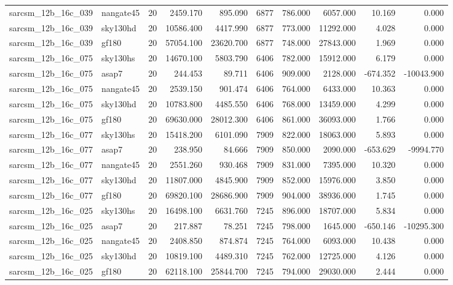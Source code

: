 \begin{tabular}{llrrrrrrrr}
sarcsm\_12b\_16c\_039 & nangate45 & 20 & 2459.170 & 895.090 & 6877 & 786.000 & 6057.000 & 10.169 & 0.000 \\
sarcsm\_12b\_16c\_039 & sky130hd & 20 & 10586.400 & 4417.990 & 6877 & 773.000 & 11292.000 & 4.028 & 0.000 \\
sarcsm\_12b\_16c\_039 & gf180 & 20 & 57054.100 & 23620.700 & 6877 & 748.000 & 27843.000 & 1.969 & 0.000 \\
sarcsm\_12b\_16c\_075 & sky130hs & 20 & 14670.100 & 5803.790 & 6406 & 782.000 & 15912.000 & 6.179 & 0.000 \\
sarcsm\_12b\_16c\_075 & asap7 & 20 & 244.453 & 89.711 & 6406 & 909.000 & 2128.000 & -674.352 & -10043.900 \\
sarcsm\_12b\_16c\_075 & nangate45 & 20 & 2539.150 & 901.474 & 6406 & 764.000 & 6433.000 & 10.363 & 0.000 \\
sarcsm\_12b\_16c\_075 & sky130hd & 20 & 10783.800 & 4485.550 & 6406 & 768.000 & 13459.000 & 4.299 & 0.000 \\
sarcsm\_12b\_16c\_075 & gf180 & 20 & 69630.000 & 28012.300 & 6406 & 861.000 & 36093.000 & 1.766 & 0.000 \\
sarcsm\_12b\_16c\_077 & sky130hs & 20 & 15418.200 & 6101.090 & 7909 & 822.000 & 18063.000 & 5.893 & 0.000 \\
sarcsm\_12b\_16c\_077 & asap7 & 20 & 238.950 & 84.666 & 7909 & 850.000 & 2090.000 & -653.629 & -9994.770 \\
sarcsm\_12b\_16c\_077 & nangate45 & 20 & 2551.260 & 930.468 & 7909 & 831.000 & 7395.000 & 10.320 & 0.000 \\
sarcsm\_12b\_16c\_077 & sky130hd & 20 & 11807.000 & 4845.900 & 7909 & 852.000 & 15976.000 & 3.850 & 0.000 \\
sarcsm\_12b\_16c\_077 & gf180 & 20 & 69820.100 & 28686.900 & 7909 & 904.000 & 38936.000 & 1.745 & 0.000 \\
sarcsm\_12b\_16c\_025 & sky130hs & 20 & 16498.100 & 6631.760 & 7245 & 896.000 & 18707.000 & 5.834 & 0.000 \\
sarcsm\_12b\_16c\_025 & asap7 & 20 & 217.887 & 78.251 & 7245 & 798.000 & 1645.000 & -650.146 & -10295.300 \\
sarcsm\_12b\_16c\_025 & nangate45 & 20 & 2408.850 & 874.874 & 7245 & 764.000 & 6093.000 & 10.438 & 0.000 \\
sarcsm\_12b\_16c\_025 & sky130hd & 20 & 10819.100 & 4489.310 & 7245 & 762.000 & 12725.000 & 4.126 & 0.000 \\
sarcsm\_12b\_16c\_025 & gf180 & 20 & 62118.100 & 25844.700 & 7245 & 794.000 & 29030.000 & 2.444 & 0.000 \\

\end{tabular}
